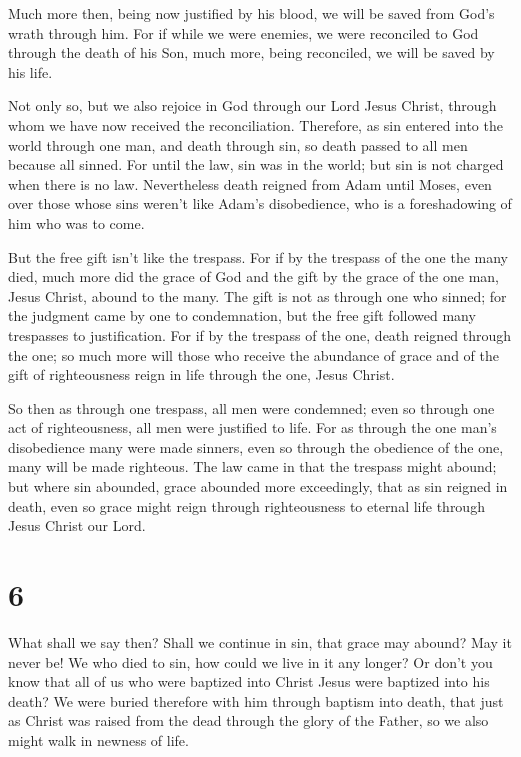  Much more then, being now justified by his blood, we will
be saved from God's wrath through him.  For if while we
were enemies, we were reconciled to God through the death of his Son,
much more, being reconciled, we will be saved by his life.

 Not only so, but we also rejoice in God through our Lord
Jesus Christ, through whom we have now received the reconciliation.
 Therefore, as sin entered into the world through one man,
and death through sin, so death passed to all men because all sinned.
 For until the law, sin was in the world; but sin is not
charged when there is no law.  Nevertheless death reigned
from Adam until Moses, even over those whose sins weren't like Adam's
disobedience, who is a foreshadowing of him who was to come.

 But the free gift isn't like the trespass. For if by the
trespass of the one the many died, much more did the grace of God and
the gift by the grace of the one man, Jesus Christ, abound to the many.
 The gift is not as through one who sinned; for the
judgment came by one to condemnation, but the free gift followed many
trespasses to justification.  For if by the trespass of the
one, death reigned through the one; so much more will those who receive
the abundance of grace and of the gift of righteousness reign in life
through the one, Jesus Christ.

 So then as through one trespass, all men were condemned;
even so through one act of righteousness, all men were justified to
life.  For as through the one man's disobedience many were
made sinners, even so through the obedience of the one, many will be
made righteous.  The law came in that the trespass might
abound; but where sin abounded, grace abounded more exceedingly,
 that as sin reigned in death, even so grace might reign
through righteousness to eternal life through Jesus Christ our Lord.

\hypertarget{section-5}{%
\section{6}\label{section-5}}

 What shall we say then? Shall we continue in sin, that
grace may abound?  May it never be! We who died to sin, how
could we live in it any longer?  Or don't you know that all
of us who were baptized into Christ Jesus were baptized into his death?
 We were buried therefore with him through baptism into
death, that just as Christ was raised from the dead through the glory of
the Father, so we also might walk in newness of life.

